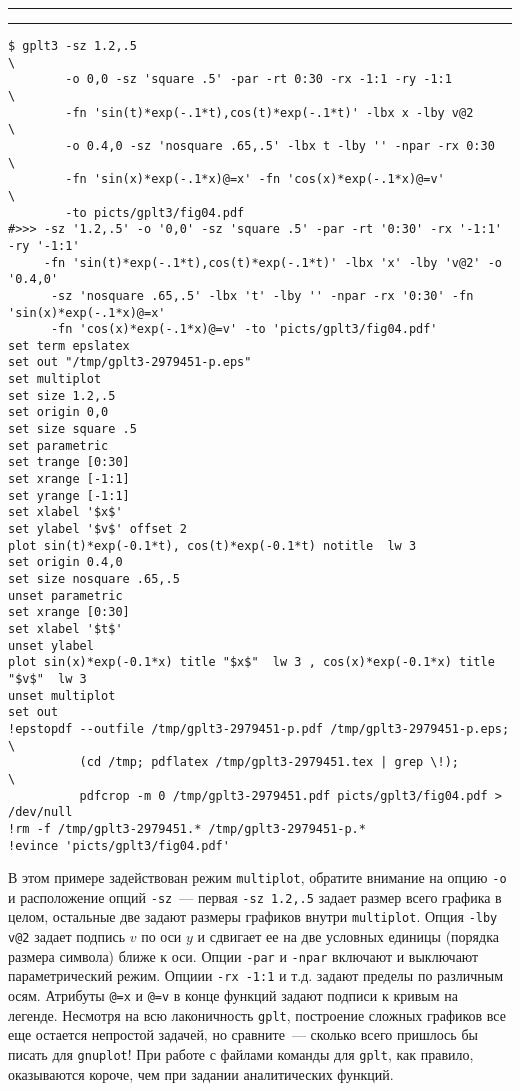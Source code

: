 \documentclass[12pt]{article}
\def\gplt{{\tt gplt}}
\def\gnuplot{{\tt gnuplot}}
\begin{document}
\noindent\rule{.45\textwidth}{1pt}\hfill \raisebox{-.45\height}{\bf № 3.}  \hfill\rule{.45\textwidth}{1pt}

{\small
\begin{verbatim}
$ gplt3 -sz 1.2,.5                                                              \
        -o 0,0 -sz 'square .5' -par -rt 0:30 -rx -1:1 -ry -1:1                  \
        -fn 'sin(t)*exp(-.1*t),cos(t)*exp(-.1*t)' -lbx x -lby v@2               \
        -o 0.4,0 -sz 'nosquare .65,.5' -lbx t -lby '' -npar -rx 0:30            \
        -fn 'sin(x)*exp(-.1*x)@=x' -fn 'cos(x)*exp(-.1*x)@=v'                   \
        -to picts/gplt3/fig04.pdf 
#>>> -sz '1.2,.5' -o '0,0' -sz 'square .5' -par -rt '0:30' -rx '-1:1' -ry '-1:1' 
     -fn 'sin(t)*exp(-.1*t),cos(t)*exp(-.1*t)' -lbx 'x' -lby 'v@2' -o '0.4,0' 
      -sz 'nosquare .65,.5' -lbx 't' -lby '' -npar -rx '0:30' -fn 'sin(x)*exp(-.1*x)@=x' 
      -fn 'cos(x)*exp(-.1*x)@=v' -to 'picts/gplt3/fig04.pdf'
set term epslatex 
set out "/tmp/gplt3-2979451-p.eps"
set multiplot
set size 1.2,.5
set origin 0,0
set size square .5
set parametric
set trange [0:30]
set xrange [-1:1]
set yrange [-1:1]
set xlabel '$x$'
set ylabel '$v$' offset 2
plot sin(t)*exp(-0.1*t), cos(t)*exp(-0.1*t) notitle  lw 3 
set origin 0.4,0
set size nosquare .65,.5
unset parametric
set xrange [0:30]
set xlabel '$t$'
unset ylabel
plot sin(x)*exp(-0.1*x) title "$x$"  lw 3 , cos(x)*exp(-0.1*x) title "$v$"  lw 3 
unset multiplot
set out
!epstopdf --outfile /tmp/gplt3-2979451-p.pdf /tmp/gplt3-2979451-p.eps;        \
          (cd /tmp; pdflatex /tmp/gplt3-2979451.tex | grep \!);               \
          pdfcrop -m 0 /tmp/gplt3-2979451.pdf picts/gplt3/fig04.pdf > /dev/null
!rm -f /tmp/gplt3-2979451.* /tmp/gplt3-2979451-p.*
!evince 'picts/gplt3/fig04.pdf'\end{verbatim}
  }

  \begin{center}
  \epsfig{file=picts/gplt3/fig04}
\end{center}
В этом примере задействован режим \verb'multiplot', обратите внимание на опцию \verb'-o' и расположение опций \verb'-sz'~---
первая \verb'-sz 1.2,.5' задает размер всего графика в целом, остальные две задают размеры графиков внутри \verb'multiplot'.
Опция \verb'-lby v@2' задает подпись $v$ по оси $y$ и сдвигает ее на две условных единицы (порядка размера символа) ближе к оси. Опции \verb'-par' и \verb'-npar'
включают и выключают параметрический режим. Опциии \verb'-rx -1:1' и т.д. задают пределы по различным осям. Атрибуты \verb'@=x' и  \verb'@=v' в конце функций
задают подписи к кривым на легенде.
Несмотря на всю лаконичность \gplt, построение сложных графиков все еще остается непростой задачей, но сравните~--- сколько всего пришлось бы писать для \gnuplot!
При работе с файлами команды для \gplt{}, как правило, оказываются короче, чем при задании  аналитических функций.\\
\end{document}
